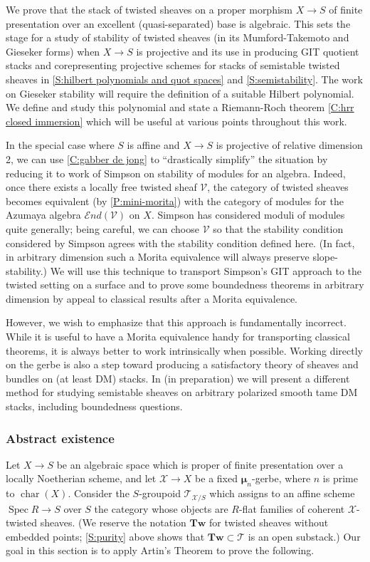 \documentclass[11pt]{amsart}
\newcommand{\ms}[1]{\mathscr #1}
\newcommand{\send}{\ms E\!nd}
\newcommand{\spec}{\operatorname{Spec}}
\newcommand{\m}{\boldsymbol{\mu}}
\newcommand{\ch}{\operatorname{char}}
\renewcommand{\[}{[\!\hspace{0.03em}[}
\renewcommand{\]}{]\!\hspace{0.03em}]}
\renewcommand{\(}{(\!\hspace{0.03em}(}
\renewcommand{\)}{)\!\hspace{0.03em})}
\newcommand{\Tw}{\mathbf{Tw}}
\theoremstyle{definition}
\theoremstyle{remark}
\begin{document}
We prove that the stack of twisted sheaves on a proper 
morphism $X\to S$ of finite presentation over an excellent (quasi-separated) 
base is algebraic.  
This sets the stage for a study of 
stability of twisted sheaves (in its Mumford-Takemoto and Gieseker 
forms) when $X\to S$ is projective and its use in producing GIT quotient stacks 
and corepresenting projective schemes for stacks of semistable twisted sheaves in 
\ref{S:hilbert polynomials and quot spaces} and \ref{S:semistability}.  The work 
on Gieseker stability will require the definition of a suitable Hilbert 
polynomial.  We define and study this polynomial and state 
a Riemann-Roch theorem \ref{C:hrr closed immersion} which will be useful at 
various points throughout this work.

In the special case where $S$ is affine and $X\to S$ is projective of 
relative dimension 2, 
we can use \ref{C:gabber de jong} to ``drastically simplify'' the 
situation by reducing it to work of Simpson on stability of modules 
for an algebra.  Indeed, once there exists a locally free twisted 
sheaf $\ms V$, the category of twisted sheaves becomes equivalent (by 
\ref{P:mini-morita}) 
with the category of modules for the Azumaya algebra $\send(\ms V)$ 
on $X$.  Simpson has 
considered moduli of modules \cite{simpson} quite generally; being careful, we can choose $\ms 
V$ so that the stability condition considered by Simpson agrees with 
the stability condition defined here.  (In fact, in arbitrary 
dimension such a Morita equivalence will always preserve 
slope-stability.)  We will use this 
technique to transport Simpson's GIT approach to the twisted setting 
on a surface and to prove some boundedness theorems in arbitrary 
dimension by appeal to classical results after a Morita 
equivalence.

However, we wish to emphasize that this approach is fundamentally 
incorrect.  While it is useful to have a Morita equivalence handy for 
transporting classical theorems, it is always better to 
work intrinsically when possible.  Working directly on the gerbe is also a step toward 
producing a satisfactory theory of sheaves and bundles on (at least 
DM) stacks.  In \cite{orbifoldmoduli} (in preparation) we will present a different method for studying semistable sheaves on arbitrary polarized smooth tame DM stacks, including boundedness questions.

\subsubsection{Abstract existence}
Let $X\to S$ be an algebraic 
space which is proper of finite presentation over a locally 
Noetherian scheme, 
and let $\ms X\to X$ be a fixed $\m_{n}$-gerbe, where $n$ is prime 
to $\ch(X)$.  Consider the 
$S$-groupoid $\ms T_{\ms X/S}$ which assigns to an affine scheme $\spec R\to S$ over 
$S$ the category whose objects are $R$-flat families of coherent $\ms 
X$-twisted sheaves.  (We reserve the notation $\Tw$ for twisted 
sheaves without embedded points; \ref{S:purity} above shows that 
$\Tw\subset\ms T$ is an open substack.)  Our goal in this section is to apply Artin's 
Theorem \cite{artin} to prove the following.
\end{document}
